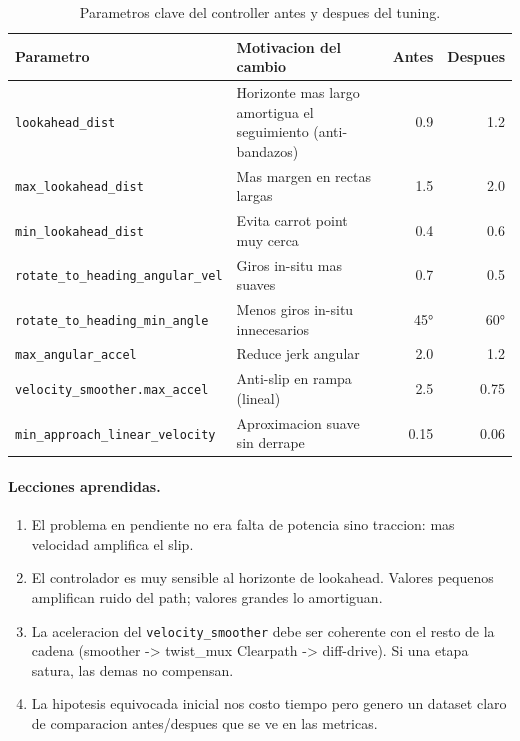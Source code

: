 \documentclass[11pt,a4paper]{article}
\begin{document}
\begin{table}[H]
  \centering
  \caption{Parametros clave del controller antes y despues del tuning.}
  \label{tab:tuning}
  \begin{tabularx}{\linewidth}{lXrr}
    \toprule
    Parametro & Motivacion del cambio & Antes & Despues \\
    \midrule
    \texttt{lookahead\_dist}                  & Horizonte mas largo amortigua el seguimiento (anti-bandazos) & 0.9 & 1.2 \\
    \texttt{max\_lookahead\_dist}             & Mas margen en rectas largas       & 1.5 & 2.0 \\
    \texttt{min\_lookahead\_dist}             & Evita carrot point muy cerca       & 0.4 & 0.6 \\
    \texttt{rotate\_to\_heading\_angular\_vel}& Giros in-situ mas suaves           & 0.7 & 0.5 \\
    \texttt{rotate\_to\_heading\_min\_angle}  & Menos giros in-situ innecesarios   & 45° & 60° \\
    \texttt{max\_angular\_accel}              & Reduce jerk angular                & 2.0 & 1.2 \\
    \texttt{velocity\_smoother.max\_accel}    & Anti-slip en rampa (lineal)        & 2.5 & 0.75 \\
    \texttt{min\_approach\_linear\_velocity}  & Aproximacion suave sin derrape     & 0.15 & 0.06 \\
    \bottomrule
  \end{tabularx}
\end{table}

\paragraph{Lecciones aprendidas.}
\begin{enumerate}
  \item El problema en pendiente no era falta de potencia sino traccion: mas velocidad amplifica el slip.
  \item El controlador es muy sensible al horizonte de lookahead. Valores pequenos amplifican ruido del path; valores grandes lo amortiguan.
  \item La aceleracion del \texttt{velocity\_smoother} debe ser coherente con el resto de la cadena (smoother -> twist\_mux Clearpath -> diff-drive). Si una etapa satura, las demas no compensan.
  \item La hipotesis equivocada inicial nos costo tiempo pero genero un dataset claro de comparacion antes/despues que se ve en las metricas.
\end{enumerate}
\end{document}
